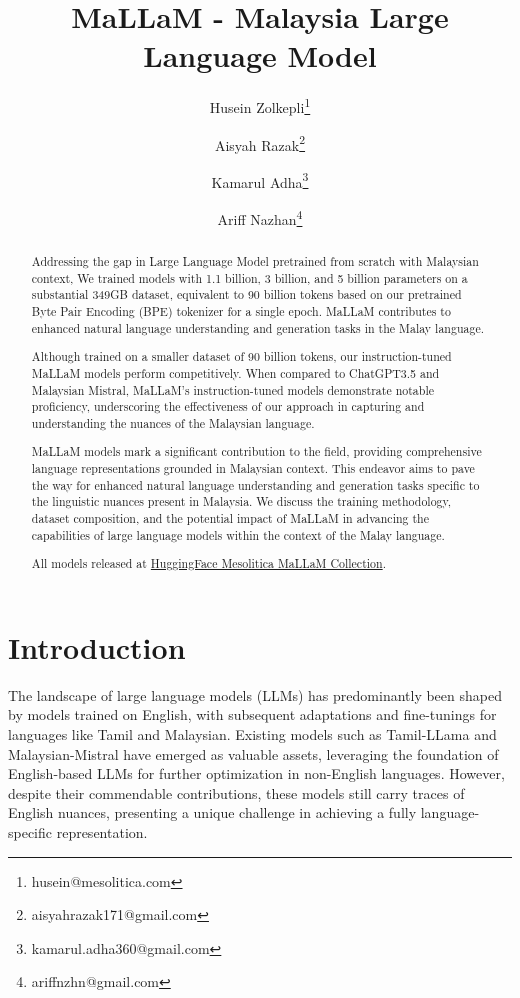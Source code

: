 \documentclass[preprint]{article}
\title{MaLLaM - Malaysia Large Language Model}
\author{
  Husein Zolkepli\thanks{husein@mesolitica.com} \and 
  Aisyah Razak\thanks{aisyahrazak171@gmail.com} \and
  Kamarul Adha\thanks{kamarul.adha360@gmail.com} \and
  Ariff Nazhan\thanks{ariffnzhn@gmail.com}
}
\begin{document}
\maketitle

\begin{abstract}
  Addressing the gap in Large Language Model pretrained from scratch with Malaysian context, We trained models with 1.1 billion, 3 billion, and 5 billion parameters on a substantial 349GB dataset, equivalent to 90 billion tokens based on our pretrained Byte Pair Encoding (BPE) tokenizer for a single epoch. MaLLaM contributes to enhanced natural language understanding and generation tasks in the Malay language.

  Although trained on a smaller dataset of 90 billion tokens, our instruction-tuned MaLLaM models perform competitively. When compared to ChatGPT3.5 and Malaysian Mistral, MaLLaM's instruction-tuned models demonstrate notable proficiency, underscoring the effectiveness of our approach in capturing and understanding the nuances of the Malaysian language.

  MaLLaM models mark a significant contribution to the field, providing comprehensive language representations grounded in Malaysian context. This endeavor aims to pave the way for enhanced natural language understanding and generation tasks specific to the linguistic nuances present in Malaysia. We discuss the training methodology, dataset composition, and the potential impact of MaLLaM in advancing the capabilities of large language models within the context of the Malay language.

  All models released at \href{https://huggingface.co/collections/mesolitica/mallam-6577b59d1e0b436ae75f930f}{HuggingFace Mesolitica MaLLaM Collection}.

\end{abstract}

\section{Introduction}

The landscape of large language models (LLMs) has predominantly been shaped by models trained on English, with subsequent adaptations and fine-tunings for languages like Tamil and Malaysian. Existing models such as Tamil-LLama \cite{balachandran2023tamilllama} and Malaysian-Mistral \cite{zolkepli2024large} have emerged as valuable assets, leveraging the foundation of English-based LLMs for further optimization in non-English languages. However, despite their commendable contributions, these models still carry traces of English nuances, presenting a unique challenge in achieving a fully language-specific representation.
\end{document}
